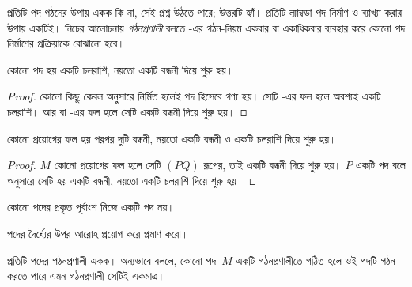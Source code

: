\documentclass[../../../include/open-logic-section]{subfiles}
\begin{document}

প্রতিটি পদ গঠনের উপায় একক কি না, সেই প্রশ্ন উঠতে পারে; উত্তরটি হ্যাঁ।
প্রতিটি ল্যাম্বডা পদ নির্মাণ ও ব্যাখ্যা করার উপায় একটিই। নিচের আলোচনায়
\emph{গঠনপ্রণালী} বলতে -এর গঠন-নিয়ম একবার বা
একাধিকবার ব্যবহার করে কোনো পদ নির্মাণের প্রক্রিয়াকে বোঝানো হবে।

\begin{lem}
কোনো পদ হয় একটি চলরাশি, নয়তো একটি বন্ধনী দিয়ে শুরু হয়।
\end{lem}

\begin{proof}
কোনো কিছু কেবল  অনুসারে নির্মিত হলেই পদ হিসেবে
গণ্য হয়। সেটি -এর ফল হলে অবশ্যই একটি চলরাশি।
আর  বা -এর ফল হলে
সেটি একটি বন্ধনী দিয়ে শুরু হয়।
\end{proof}

\begin{lem}
কোনো প্রয়োগের ফল হয় পরপর দুটি বন্ধনী, নয়তো একটি বন্ধনী ও একটি চলরাশি
দিয়ে শুরু হয়।
\end{lem}

\begin{proof}
$M$ কোনো প্রয়োগের ফল হলে সেটি $(PQ)$ রূপের, তাই একটি বন্ধনী দিয়ে শুরু
হয়। $P$ একটি পদ বলে  অনুসারে সেটি হয় একটি বন্ধনী,
নয়তো একটি চলরাশি দিয়ে শুরু হয়।
\end{proof}

\begin{lem}
কোনো পদের প্রকৃত পূর্বাংশ নিজে একটি পদ নয়।
\end{lem}

\begin{prob}
পদের দৈর্ঘ্যের উপর আরোহ প্রয়োগ করে 
প্রমাণ করো।
\end{prob}

\begin{prop}[একক পাঠযোগ্যতা] 
প্রতিটি পদের গঠনপ্রণালী একক। অন্যভাবে বললে, কোনো পদ~$M$ একটি
গঠনপ্রণালীতে গঠিত হলে ওই পদটি গঠন করতে পারে এমন গঠনপ্রণালী সেটিই একমাত্র।
\end{prop}
\end{document}
